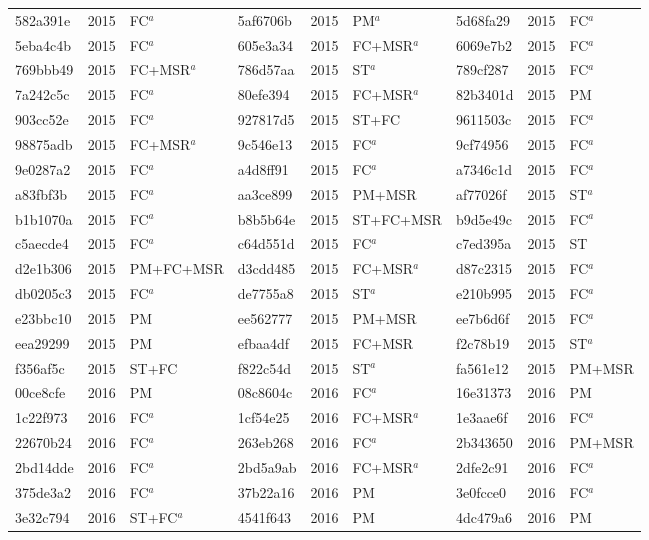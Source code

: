 \begin{longtable}{lll@{\hspace{10pt}}lll@{\hspace{10pt}}lll}
582a391e & 2015 & FC$^{a}$ & 5af6706b & 2015 & PM$^{a}$ & 5d68fa29 & 2015 & FC$^{a}$ \\
5eba4c4b & 2015 & FC$^{a}$ & 605e3a34 & 2015 & FC+MSR$^{a}$ & 6069e7b2 & 2015 & FC$^{a}$ \\
769bbb49 & 2015 & FC+MSR$^{a}$ & 786d57aa & 2015 & ST$^{a}$ & 789cf287 & 2015 & FC$^{a}$ \\
7a242c5c & 2015 & FC$^{a}$ & 80efe394 & 2015 & FC+MSR$^{a}$ & 82b3401d & 2015 & PM \\
903cc52e & 2015 & FC$^{a}$ & 927817d5 & 2015 & ST+FC & 9611503c & 2015 & FC$^{a}$ \\
98875adb & 2015 & FC+MSR$^{a}$ & 9c546e13 & 2015 & FC$^{a}$ & 9cf74956 & 2015 & FC$^{a}$ \\
9e0287a2 & 2015 & FC$^{a}$ & a4d8ff91 & 2015 & FC$^{a}$ & a7346c1d & 2015 & FC$^{a}$ \\
a83fbf3b & 2015 & FC$^{a}$ & aa3ce899 & 2015 & PM+MSR & af77026f & 2015 & ST$^{a}$ \\
b1b1070a & 2015 & FC$^{a}$ & b8b5b64e & 2015 & ST+FC+MSR & b9d5e49c & 2015 & FC$^{a}$ \\
c5aecde4 & 2015 & FC$^{a}$ & c64d551d & 2015 & FC$^{a}$ & c7ed395a & 2015 & ST \\
d2e1b306 & 2015 & PM+FC+MSR & d3cdd485 & 2015 & FC+MSR$^{a}$ & d87c2315 & 2015 & FC$^{a}$ \\
db0205c3 & 2015 & FC$^{a}$ & de7755a8 & 2015 & ST$^{a}$ & e210b995 & 2015 & FC$^{a}$ \\
e23bbc10 & 2015 & PM & ee562777 & 2015 & PM+MSR & ee7b6d6f & 2015 & FC$^{a}$ \\
eea29299 & 2015 & PM & efbaa4df & 2015 & FC+MSR & f2c78b19 & 2015 & ST$^{a}$ \\
f356af5c & 2015 & ST+FC & f822c54d & 2015 & ST$^{a}$ & fa561e12 & 2015 & PM+MSR \\
00ce8cfe & 2016 & PM & 08c8604c & 2016 & FC$^{a}$ & 16e31373 & 2016 & PM \\
1c22f973 & 2016 & FC$^{a}$ & 1cf54e25 & 2016 & FC+MSR$^{a}$ & 1e3aae6f & 2016 & FC$^{a}$ \\
22670b24 & 2016 & FC$^{a}$ & 263eb268 & 2016 & FC$^{a}$ & 2b343650 & 2016 & PM+MSR \\
2bd14dde & 2016 & FC$^{a}$ & 2bd5a9ab & 2016 & FC+MSR$^{a}$ & 2dfe2c91 & 2016 & FC$^{a}$ \\
375de3a2 & 2016 & FC$^{a}$ & 37b22a16 & 2016 & PM & 3e0fcce0 & 2016 & FC$^{a}$ \\
3e32c794 & 2016 & ST+FC$^{a}$ & 4541f643 & 2016 & PM & 4dc479a6 & 2016 & PM \\

\end{longtable}
